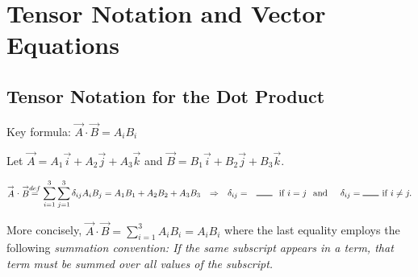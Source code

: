 
\chapter{Tensor Notation and Vector Equations} %

\label{Chapter1} %


\newcommand{\keyword}[1]{\textbf{#1}}
\newcommand{\tabhead}[1]{\textbf{#1}}
\newcommand{\code}[1]{\texttt{#1}}
\newcommand{\file}[1]{\texttt{\bfseries#1}}
\newcommand{\option}[1]{\texttt{\itshape#1}}

\section{Tensor Notation for the Dot Product}
{\flushleft Key formula:   $\stackrel{\rightarrow}{A} \cdot \stackrel{\rightarrow}{B} = A_iB_i $ }
\vspace{.2in}

Let $\stackrel{\rightarrow}{A}=A_1\stackrel{\rightarrow}{i }+A_2\stackrel{\rightarrow}{j }+A_3\stackrel{\rightarrow}{k }$ and
$\stackrel{\rightarrow}{B}=B_1\stackrel{\rightarrow}{i }+B_2\stackrel{\rightarrow}{j }+B_3\stackrel{\rightarrow}{k }$.

\begin{displaymath}
\stackrel{\rightarrow}{A} \cdot \stackrel{\rightarrow}{B} \stackrel{def}{=} \sum_{i=1}^3 \sum_{j=1}^3 \delta_{ij}A_iB_j =A_1B_1+A_2B_2+A_3B_3\hspace{.1in} \Rightarrow \hspace{.1in}  \delta_{ij} = \hspace{.1in}\rule{.25in}{.01in}\hspace{.1in} \textup{if}\hspace{.05in} i=j \hspace{.1in}\textup{and} \hspace{.2in} \delta_{ij}=\rule{.25in}{.01in} \hspace{.05in}\textup{if}\hspace{.05in} i\neq j.
\end{displaymath}

{\flushleft More} concisely, $\stackrel{\rightarrow}{A} \cdot \stackrel{\rightarrow}{B} = \sum_{i=1}^3 A_iB_i = A_iB_i$ where the last equality employs the following \emph{summation convention: If the same subscript appears in a term, that term must be summed over all values of the subscript.}

